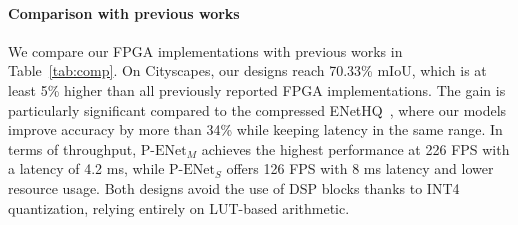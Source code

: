 \documentclass[11pt]{report}
\begin{document}
\paragraph{Comparison with previous works}

We compare our FPGA implementations with previous works in Table~\ref{tab:comp}. On Cityscapes, our designs reach 70.33\% mIoU, which is at least 5\% higher than all previously reported FPGA implementations. The gain is particularly significant compared to the compressed ENetHQ~\cite{ghielmetti2022realtime}, where our models improve accuracy by more than 34\% while keeping latency in the same range. In terms of throughput, $\text{P-ENet}_{M}$ achieves the highest performance at 226 FPS with a latency of 4.2 ms, while $\text{P-ENet}_{S}$ offers 126 FPS with 8 ms latency and lower resource usage. Both designs avoid the use of DSP blocks thanks to INT4 quantization, relying entirely on LUT-based arithmetic.
\end{document}
